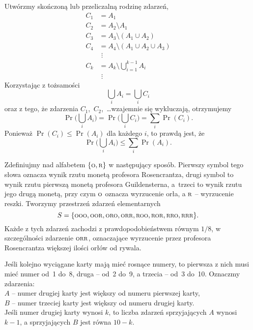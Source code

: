 
\exercise{} %
Utwórzmy skończoną lub przeliczalną rodzinę zdarzeń,
\begin{align*}
	C_1 &= A_1 \\
	C_2 &= A_2\setminus A_1 \\
	C_3 &= A_3\setminus(A_1\cup A_2) \\
	C_4 &= A_4\setminus(A_1\cup A_2\cup A_3) \\
	& \,\,\vdots \\
	C_k &= A_k\setminus\bigcup_{i=1}^{k-1}A_i \\
	& \,\,\vdots
\end{align*}
Korzystając z tożsamości
\[
	\bigcup_iA_i = \bigcup_iC_i
\]
oraz z tego, że zdarzenia $C_1$,~$C_2$,~\dots wzajemnie się wykluczają, otrzymujemy
\[
	\Pr\biggl(\bigcup_iA_i\biggr) = \Pr\biggl(\bigcup_iC_i\biggr) = \sum_i\Pr(C_i).
\]
Ponieważ $\Pr(C_i)\le\Pr(A_i)$ dla każdego $i$, to prawdą jest, że
\[
	\Pr\biggl(\bigcup_iA_i\biggr) \le \sum_i\Pr(A_i).
\]

\exercise{} %
Zdefiniujmy  nad alfabetem $\{{\scriptstyle\rm O},{\scriptstyle\rm R}\}$ w następujący sposób. Pierwszy symbol tego słowa oznacza wynik rzutu monetą profesora Rosencrantza, drugi symbol to wynik rzutu pierwszą monetą profesora Guildensterna, a~trzeci to wynik rzutu jego drugą monetą, przy czym $\scriptstyle\rm O$ oznacza wyrzucenie orła, a $\scriptstyle\rm R$ -- wyrzucenie reszki. Tworzymy przestrzeń zdarzeń elementarnych
\[
	S = \{{\scriptstyle\rm OOO},{\scriptstyle\rm OOR},{\scriptstyle\rm ORO},{\scriptstyle\rm ORR},{\scriptstyle\rm ROO},{\scriptstyle\rm ROR},{\scriptstyle\rm RRO},{\scriptstyle\rm RRR}\}.
\]
Każde z tych zdarzeń zachodzi z prawdopodobieństwem równym $1/8$, w szczególności zdarzenie $\scriptstyle\rm ORR$, oznaczające wyrzucenie przez profesora Rosencrantza większej ilości orłów od rywala.

\exercise{} %
Jeśli kolejno wyciągane karty mają mieć rosnące numery, to pierwsza z nich musi mieć numer od~1 do~8, druga -- od~2 do~9, a trzecia -- od~3 do~10. Oznaczmy zdarzenia: \\
\hspace*\parindent$A$ -- numer drugiej karty jest większy od numeru pierwszej karty, \\
\hspace*\parindent$B$ -- numer trzeciej karty jest większy od numeru drugiej karty. \\
Jeśli numer drugiej karty wynosi $k$, to liczba zdarzeń sprzyjających $A$ wynosi $k-1$, a sprzyjających $B$ jest równa $10-k$.

